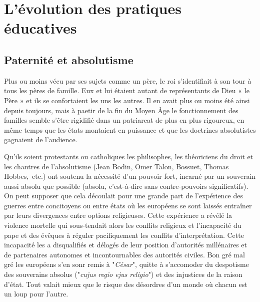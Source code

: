 
\chapter{L'évolution des pratiques éducatives}


 \section{Paternité et absolutisme}


Plus ou moins vécu par ses sujets comme un père, le roi s'identifiait à son tour à tous les pères de famille. Eux et lui étaient autant de représentants de Dieu « le Père » et ils se confortaient les uns les autres. Il en avait plus ou moins été ainsi depuis toujours, mais à paetir de la fin du Moyen Âge le fonctionnement des familles semble s'être rigidifié dans un patriarcat de plus en plus rigoureux, en même temps que les états montaient en puissance et que les doctrines absolutistes gagnaient de l'audience. 

Qu'ils soient protestants ou catholiques les philisophes, les théoriciens du droit et les chantres de l'absolutisme (Jean Bodin, Omer Talon, Bossuet, Thomas Hobbes,~etc.) ont soutenu la nécessité d'un pouvoir fort, incarné par un souverain aussi absolu que possible (absolu, c'est-à-dire sans contre-pouvoirs significatifs). On peut supposer que cela découlait pour une grande part de l'expérience des guerres entre concitoyens ou entre états où les européens se sont laissés entraîner par leurs divergences entre options religieuses. Cette expérience a révélé la violence mortelle qui sous-tendait alors les conflits religieux et l'incapacité du pape et des évêques à réguler pacifiquement les conflits d'interprétation. Cette incapacité les a disqualifiés et délogés de leur position d'autorités millénaires et de partenaires autonomes et incontournables des autorités civiles. Bon gré mal gré les européens s'en sonr remis à "\emph{César}", quitte à s'accomoder du despotisme des souverains absolus ("\emph{cujus regio ejus religio}") et des injustices de la raison d'état. Tout valait mieux que le risque des désordres d'un monde où chacun est un loup pour l'autre. 

